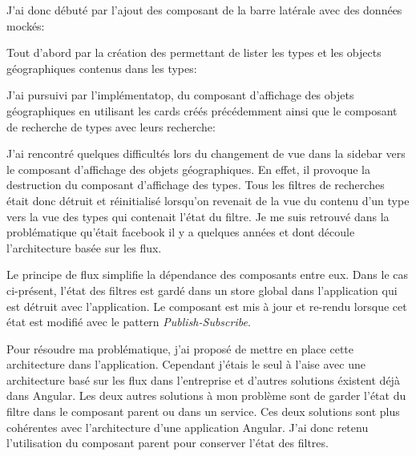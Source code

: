 \documentclass{rapportUHA40}
\begin{document}
\newpage
J'ai donc débuté par l'ajout des composant de la barre latérale avec des
données mockés:


Tout d'abord par la création des  \fg{} permettant de lister les
types et les objects géographiques contenus dans les types:

J'ai pursuivi par l'implémentatop, du composant d'affichage des objets
géographiques en utilisant les cards créés précédemment ainsi que le composant
de recherche de types avec leurs recherche:

J'ai rencontré quelques difficultés lors du changement de vue dans la sidebar
vers le composant d'affichage des objets géographiques. En effet, il provoque
la destruction du composant d'affichage des types. Tous les filtres de
recherches était donc détruit et réinitialisé lorsqu'on revenait de la vue du
contenu d'un type vers la vue des types qui contenait l'état du filtre. Je me
suis retrouvé dans la problématique qu'était facebook il y a quelques années et
dont découle l'architecture basée sur les flux.


Le principe de flux simplifie la dépendance des composants entre eux. Dans le
cas ci-présent, l'état des filtres est gardé dans un store global dans
l'application qui est détruit avec l'application. Le composant est mis à jour
et re-rendu lorsque cet état est modifié avec le pattern
\textit{Publish-Subscribe}.

Pour résoudre ma problématique, j'ai proposé de mettre en place cette
architecture dans l'application. Cependant j'étais le seul à l'aise avec une
architecture basé sur les flux dans l'entreprise et d'autres solutions éxistent
déjà dans Angular. Les deux autres solutions à mon problème sont de garder
l'état du filtre dans le composant parent ou dans un service. Ces deux
solutions sont plus cohérentes avec l'architecture d'une application Angular.
J'ai donc retenu l'utilisation du composant parent pour conserver l'état des
filtres.\\
\end{document}
